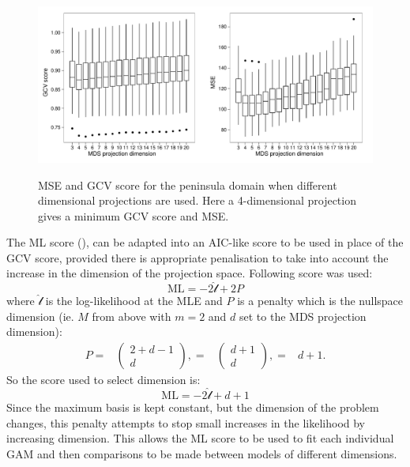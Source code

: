 \begin{figure}
\centering
\includegraphics[width=6in]{mds/figs/wt2-gcv-projdim-boxplot.pdf} \\
\caption{MSE and GCV score for the peninsula domain when different dimensional projections are used. Here a 4-dimensional projection gives a minimum GCV score and MSE.}
\label{wt2-gcv-projdim-boxplot}
\end{figure}

The ML score (\cite{remlpaper}), can be adapted into an AIC-like score to be used in place of the GCV score, provided there is appropriate penalisation to take into account the increase in the dimension of the projection space. Following score was used:
\begin{equation*}
\text{ML} = -2 \hat{\mathcal{l}} + 2P
\end{equation*}
where $\hat{\mathcal{l}}$ is the log-likelihood at the MLE and $P$ is a penalty which is the nullspace dimension (ie. $M$ from above with $m=2$ and $d$ set to the MDS projection dimension):
\begin{align*}
P =& \begin{pmatrix} 2+d-1 \\ d  \end{pmatrix},
=& \begin{pmatrix} d+1 \\ d  \end{pmatrix},
=& d+1.
\end{align*}
So the score used to select dimension is:
\begin{equation*}
\text{ML} = -2 \hat{\mathcal{l}} + d+1
\end{equation*}
Since the maximum basis is kept constant, but the dimension of the problem changes, this penalty attempts to stop small increases in the likelihood by increasing dimension. This allows the ML score to be used to fit each individual GAM and then comparisons to be made between models of different dimensions. 

